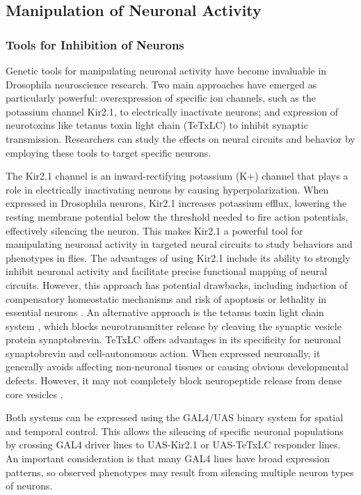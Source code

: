 \documentclass[../main/thesis_msc.tex]{subfiles}
\begin{document}
	\subsection{Manipulation of Neuronal Activity}
	\subsubsection{Tools for Inhibition of Neurons}

	Genetic tools for manipulating neuronal activity have become invaluable in Drosophila neuroscience research. Two main approaches have emerged as particularly powerful: overexpression of specific ion channels, such as the potassium channel Kir2.1, to electrically inactivate neurons; and expression of neurotoxins like tetanus toxin light chain (TeTxLC) to inhibit synaptic transmission. Researchers can study the effects on neural circuits and behavior by employing these tools to target specific neurons.

	The Kir2.1 channel is an inward-rectifying potassium (K+) channel that plays a role in electrically inactivating neurons by causing hyperpolarization. When expressed in Drosophila neurons, Kir2.1 increases potassium efflux, lowering the resting membrane potential below the threshold needed to fire action potentials, effectively silencing the neuron. This makes Kir2.1 a powerful tool for manipulating neuronal activity in targeted neural circuits to study behaviors and phenotypes in flies. The advantages of using Kir2.1 include its ability to strongly inhibit neuronal activity and facilitate precise functional mapping of neural circuits. However, this approach has potential drawbacks, including induction of compensatory homeostatic mechanisms and risk of apoptosis or lethality in essential neurons \autocite{hodge_ion_2009}. An alternative approach is the tetanus toxin light chain system \autocite{sweeney_targeted_1995}, which blocks neurotransmitter release by cleaving the synaptic vesicle protein synaptobrevin. TeTxLC offers advantages in its specificity for neuronal synaptobrevin and cell-autonomous action. When expressed neuronally, it generally avoids affecting non-neuronal tissues or causing obvious developmental defects. However, it may not completely block neuropeptide release from dense core vesicles \autocite{kaneko_disruption_2000}.

	Both systems can be expressed using the GAL4/UAS binary system for spatial and temporal control. This allows the silencing of specific neuronal populations by crossing GAL4 driver lines to UAS-Kir2.1 or UAS-TeTxLC responder lines. An important consideration is that many GAL4 lines have broad expression patterns, so observed phenotypes may result from silencing multiple neuron types of neurons.
\end{document}
